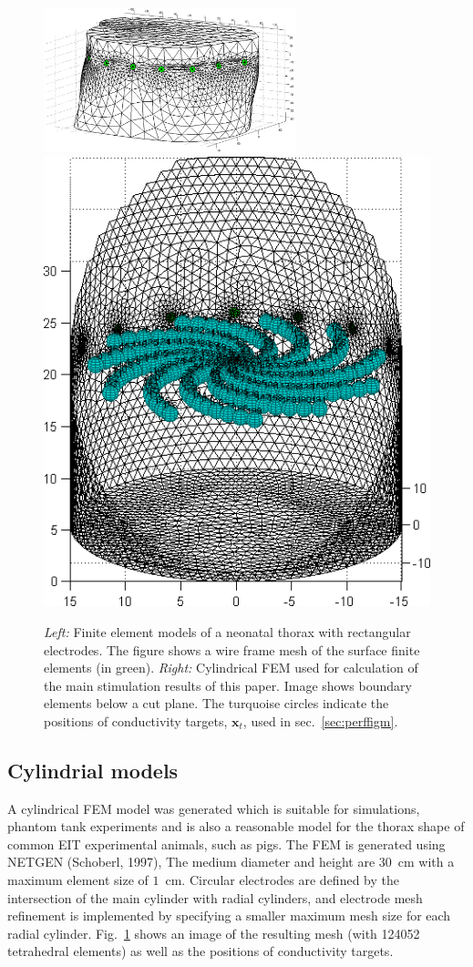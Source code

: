\documentclass[12pt]{iopart}
\newcommand{\xB}{\mbox{$\mathbf{x}$}}
\begin{document}
\begin{figure}[bhtp]
\begin{center}
   \includegraphics[width= 0.65\textwidth]
         {figures/neonate_t_mdl.png}
  \includegraphics[width= 0.3 \textwidth]
         {../../tutorial/GREIT-evaluation/simulation_3d_test02a.png}
\caption{ \label{fig:NeonateCyl}
{\em Left:}
Finite element models of a neonatal thorax with
rectangular electrodes. The figure shows a wire frame mesh
of the surface finite elements (in green).
{\em Right:}
Cylindrical FEM used for calculation of the main stimulation
results of this paper. Image shows boundary elements below a cut plane.
The turquoise circles indicate the
positions of conductivity targets, $\xB_t$, used in
sec.\ \ref{sec:perffigm}.
}
\end{center}
\end{figure}


\subsection{Cylindrial models}


A cylindrical FEM model was generated which is suitable for
simulations, phantom tank experiments and is also a reasonable
model for the thorax shape of common EIT experimental animals,
such as pigs.  The FEM is generated using NETGEN (Schoberl, 1997),
The medium diameter
and height are $30$~cm with a maximum element size of $1$~cm.
Circular electrodes are defined by the intersection of the 
main cylinder with radial cylinders, and
electrode mesh refinement is implemented by specifying a
smaller maximum mesh size for each radial cylinder.
Fig.\ \ref{fig:NeonateCyl} shows an image of the resulting
mesh (with 124052 tetrahedral elements) as well as the positions
of conductivity targets.
\end{document}
